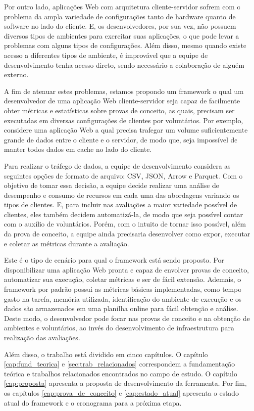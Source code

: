 \documentclass[12pt]{tcc}
\begin{document}
Por outro lado, aplicações Web com arquitetura cliente-servidor sofrem com o problema da ampla variedade de configurações tanto de hardware quanto de software no lado do cliente.
E, os desenvolvedores, por sua vez, não possuem diversos tipos de ambientes para exercitar suas aplicações, o que pode levar a problemas com alguns tipos de configurações.
Além disso, mesmo quando existe acesso a diferentes tipos de ambiente, é improvável que a equipe de desenvolvimento tenha acesso direto, sendo necessário a colaboração de alguém externo.

A fim de atenuar estes problemas, estamos propondo um framework o qual um desenvolvedor de uma aplicação Web cliente-servidor seja capaz de facilmente obter métricas e estatísticas sobre provas de conceito, as quais, precisam ser executadas em diversas configurações de clientes por voluntários.
Por exemplo, considere uma aplicação Web a qual precisa trafegar um volume suficientemente grande de dados entre o cliente e o servidor, de modo que, seja impossível de manter todos dados em cache no lado do cliente.

Para realizar o tráfego de dados, a equipe de desenvolvimento considera as seguintes opções de formato de arquivo: CSV, JSON, Arrow e Parquet.
Com o objetivo de tomar essa decisão, a equipe decide realizar uma análise de desempenho e consumo de recursos em cada uma das abordagens variando os tipos de clientes.
E, para incluir nas avaliações a maior variedade possível de clientes, eles também decidem automatizá-la, de modo que seja possível contar com o auxílio de voluntários.
Porém, com o intuito de tornar isso possível, além da prova de conceito, a equipe ainda precisaria desenvolver como expor, executar e coletar as métricas durante a avaliação.

Este é o tipo de cenário para qual o framework está sendo proposto.
Por disponibilizar uma aplicação Web pronta e capaz de envolver provas de conceito, automatizar sua execução, coletar métricas e ser de fácil extensão.
Ademais, o framework por padrão possui as métricas básicas implementadas, como tempo gasto na tarefa, memória utilizada, identificação do ambiente de execução e os dados são armazenados em uma planilha online para fácil obtenção e análise.
Deste modo, o desenvolvedor pode focar nas provas de conceito e na obtenção de ambientes e voluntários, ao invés do desenvolvimento de infraestrutura para realização das avaliações.

Além disso, o trabalho está dividido em cinco capítulos.
O capítulo \ref{cap:fund_teorica} e \ref{sec:trab_relacionados} correspondem a fundamentação teórica e trabalhos relacionados encontrados no campo de estudo.
O capítulo \ref{cap:proposta} apresenta a proposta de desenvolvimento da ferramenta.
Por fim, os capítulos \ref{cap:prova_de_conceito} e \ref{cap:estado_atual} apresenta o estado atual do framework e o cronograma para a próxima etapa.
\end{document}
